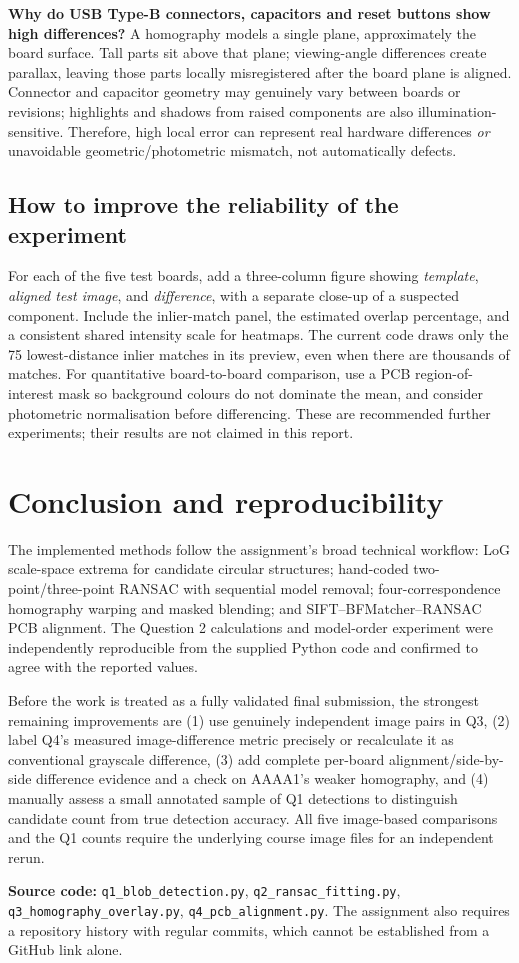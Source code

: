 \documentclass[11pt,a4paper]{article}
\begin{document}
\textbf{Why do USB Type-B connectors, capacitors and reset buttons show high differences?} A homography models a single plane, approximately the board surface. Tall parts sit above that plane; viewing-angle differences create parallax, leaving those parts locally misregistered after the board plane is aligned. Connector and capacitor geometry may genuinely vary between boards or revisions; highlights and shadows from raised components are also illumination-sensitive. Therefore, high local error can represent real hardware differences \emph{or} unavoidable geometric/photometric mismatch, not automatically defects.

\subsection{How to improve the reliability of the experiment}
For each of the five test boards, add a three-column figure showing \emph{template}, \emph{aligned test image}, and \emph{difference}, with a separate close-up of a suspected component. Include the inlier-match panel, the estimated overlap percentage, and a consistent shared intensity scale for heatmaps. The current code draws only the 75 lowest-distance inlier matches in its preview, even when there are thousands of matches. For quantitative board-to-board comparison, use a PCB region-of-interest mask so background colours do not dominate the mean, and consider photometric normalisation before differencing. These are recommended further experiments; their results are not claimed in this report.

\section{Conclusion and reproducibility}
The implemented methods follow the assignment's broad technical workflow: LoG scale-space extrema for candidate circular structures; hand-coded two-point/three-point RANSAC with sequential model removal; four-correspondence homography warping and masked blending; and SIFT--BFMatcher--RANSAC PCB alignment. The Question 2 calculations and model-order experiment were independently reproducible from the supplied Python code and confirmed to agree with the reported values.

Before the work is treated as a fully validated final submission, the strongest remaining improvements are (1) use genuinely independent image pairs in Q3, (2) label Q4's measured image-difference metric precisely or recalculate it as conventional grayscale difference, (3) add complete per-board alignment/side-by-side difference evidence and a check on AAAA1's weaker homography, and (4) manually assess a small annotated sample of Q1 detections to distinguish candidate count from true detection accuracy. All five image-based comparisons and the Q1 counts require the underlying course image files for an independent rerun.

\textbf{Source code:} \texttt{q1\_blob\_detection.py}, \texttt{q2\_ransac\_fitting.py}, \texttt{q3\_homography\_overlay.py}, \texttt{q4\_pcb\_alignment.py}. The assignment also requires a repository history with regular commits, which cannot be established from a GitHub link alone.
\end{document}
